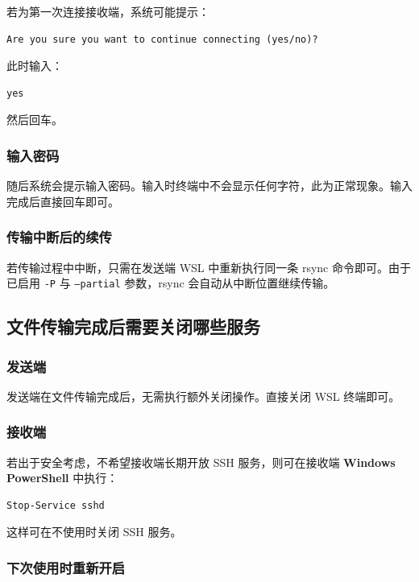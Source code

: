 \documentclass[UTF8]{ctexart}
\begin{document}
若为第一次连接接收端，系统可能提示：

\begin{lstlisting}
Are you sure you want to continue connecting (yes/no)?
\end{lstlisting}

此时输入：

\begin{lstlisting}
yes
\end{lstlisting}

然后回车。

\subsubsection{输入密码}

随后系统会提示输入密码。输入时终端中不会显示任何字符，此为正常现象。输入完成后直接回车即可。

\subsubsection{传输中断后的续传}

若传输过程中中断，只需在发送端 WSL 中重新执行同一条 rsync 命令即可。由于已启用 \texttt{-P} 与 \texttt{--partial} 参数，rsync 会自动从中断位置继续传输。

\subsection{文件传输完成后需要关闭哪些服务}

\subsubsection{发送端}

发送端在文件传输完成后，无需执行额外关闭操作。直接关闭 WSL 终端即可。

\subsubsection{接收端}

若出于安全考虑，不希望接收端长期开放 SSH 服务，则可在接收端 \textbf{Windows PowerShell} 中执行：

\begin{lstlisting}
Stop-Service sshd
\end{lstlisting}

这样可在不使用时关闭 SSH 服务。

\subsubsection{下次使用时重新开启}
\end{document}
